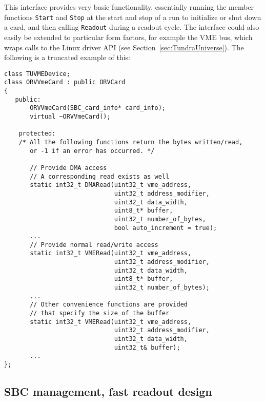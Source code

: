 This interface provides very basic functionality, essentially running the member functions \lstinline!Start! and \lstinline!Stop!
at the start and stop of a run to initialize or shut down a card, and then calling \lstinline!Readout! during a readout cycle.  
The interface could also easily be extended to particular form factors, for example the VME bus, which wraps calls to the Linux
driver API (see Section~\ref{sec:TundraUniverse}).  The following is a truncated example of this:
			\begin{lstlisting}
class TUVMEDevice;
class ORVVmeCard : public ORVCard 
{
   public:
       ORVVmeCard(SBC_card_info* card_info);
       virtual ~ORVVmeCard(); 

    protected:
	/* All the following functions return the bytes written/read,
	   or -1 if an error has occurred. */
	
       // Provide DMA access
       // A corresponding read exists as well 
       static int32_t DMARead(uint32_t vme_address,
                              uint32_t address_modifier,
                              uint32_t data_width,
                              uint8_t* buffer,
                              uint32_t number_of_bytes,
                              bool auto_increment = true);
       ...
       // Provide normal read/write access 
       static int32_t VMERead(uint32_t vme_address,
                              uint32_t address_modifier,
                              uint32_t data_width,
                              uint8_t* buffer,
                              uint32_t number_of_bytes);
       ...
       // Other convenience functions are provided
       // that specify the size of the buffer
       static int32_t VMERead(uint32_t vme_address,
                              uint32_t address_modifier,
                              uint32_t data_width,
                              uint32_t& buffer);
       ...
};
			\end{lstlisting}

		\subsection{SBC management, fast readout design}	

